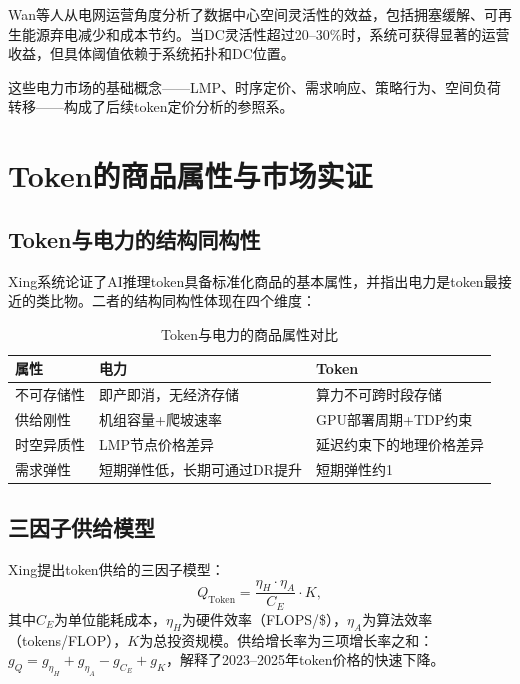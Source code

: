 \documentclass[11pt,twocolumn]{article}
\begin{document}
Wan等人\cite{wan2025grid}从电网运营角度分析了数据中心空间灵活性的效益，包括拥塞缓解、可再生能源弃电减少和成本节约。当DC灵活性超过20--30\%时，系统可获得显著的运营收益，但具体阈值依赖于系统拓扑和DC位置。

这些电力市场的基础概念——LMP、时序定价、需求响应、策略行为、空间负荷转移——构成了后续token定价分析的参照系。

\section{Token的商品属性与市场实证}

\subsection{Token与电力的结构同构性}

Xing\cite{xing2026tokenfutures}系统论证了AI推理token具备标准化商品的基本属性，并指出电力是token最接近的类比物。二者的结构同构性体现在四个维度：

\begin{table}[htbp]
\centering
\caption{Token与电力的商品属性对比}
\label{tab:token_electricity}
\begin{tabular}{p{2cm}p{3cm}p{3cm}}
\toprule
\textbf{属性} & \textbf{电力} & \textbf{Token} \\
\midrule
不可存储性 & 即产即消，无经济存储 & 算力不可跨时段存储 \\
供给刚性 & 机组容量+爬坡速率 & GPU部署周期+TDP约束 \\
时空异质性 & LMP节点价格差异 & 延迟约束下的地理价格差异 \\
需求弹性 & 短期弹性低，长期可通过DR提升 & 短期弹性约1\cite{demirer2025emerging} \\
\bottomrule
\end{tabular}
\end{table}

\subsection{三因子供给模型}

Xing\cite{xing2026tokenfutures}提出token供给的三因子模型：
\begin{equation}
Q_{\text{Token}} = \frac{\eta_H \cdot \eta_A}{C_E} \cdot K,
\label{eq:threefactor}
\end{equation}
其中$C_E$为单位能耗成本，$\eta_H$为硬件效率（FLOPS/\$），$\eta_A$为算法效率（tokens/FLOP），$K$为总投资规模。供给增长率为三项增长率之和：$g_Q = g_{\eta_H} + g_{\eta_A} - g_{C_E} + g_K$，解释了2023--2025年token价格的快速下降。
\end{document}
